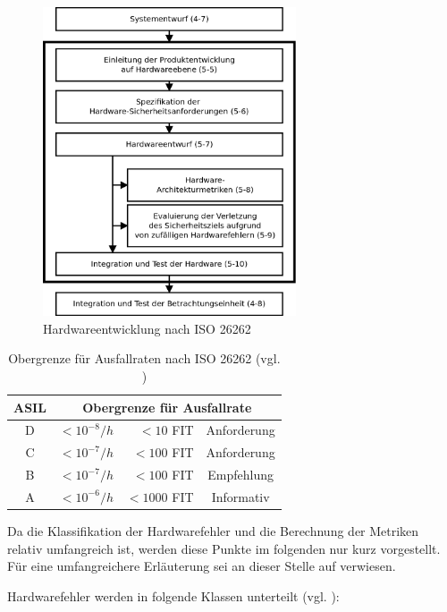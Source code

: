 \documentclass[a4paper,DIV=calc,ngerman]{scrartcl}
\begin{document}
\begin{figure}[h]
\centering
\includegraphics[width=7.5cm]{Abb_6_4}
\caption{Hardwareentwicklung nach ISO 26262\cite{1}}
\label{fig:hardware}
\end{figure}

\begin{table}[h]
\center
\begin{tabular}[h]{c r r c}
\toprule
ASIL & \multicolumn{3}{c}{Obergrenze für Ausfallrate}\\
\midrule
D & $ <10^{-8}/h $ & $ <10 $ FIT & Anforderung\\
C & $ <10^{-7}/h $ & $ <100 $ FIT   & Anforderung\\
B & $ <10^{-7}/h $ & $ <100 $ FIT   & Empfehlung\\
A & $ <10^{-6}/h $ & $ <1000 $ FIT   & Informativ\\
\bottomrule
\end{tabular}
\caption{Obergrenze für Ausfallraten nach ISO 26262 (vgl. \cite[S. 133]{1})}
\label{tab:ausfallrate}
\end{table}

Da die Klassifikation der Hardwarefehler und die Berechnung der Metriken relativ umfangreich ist, werden diese Punkte im folgenden nur kurz vorgestellt. Für eine umfangreichere Erläuterung sei an dieser Stelle auf \cite[S. 135 ff.]{1} verwiesen.

Hardwarefehler werden in folgende Klassen unterteilt (vgl. \cite[S. 136]{1}):
\end{document}
